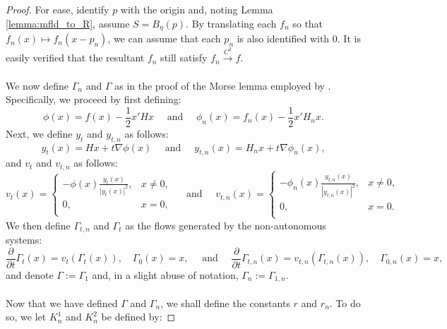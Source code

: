 \documentclass[11pt]{article}
\newcommand{\1}{\mathbf{1}}
\theoremstyle{definition}
\theoremstyle{remark}
\begin{document}
\begin{proof}
    For ease, identify $p$ with the origin and, noting Lemma \ref{lemma:mfld_to_R}, assume $S=B_\eta(p)$. By translating each $f_n$ so that $f_n(x)\mapsto f_n(x-p_n)$, we can assume that each $p_n$ is also identified with $0$. It is easily verified that the resultant $f_n$ still satisfy $f_n\xrightarrow{C^2}f$.\\
    \\
    We now define $\Gamma_n$ and $\Gamma$ as in the proof of the Morse lemma employed by \cite{ioffe1997}. Specifically, we proceed by first defining:
    \begin{equation}\nonumber
        \phi(x)=f(x)-\frac{1}{2}x'Hx \quad \text{ and } \quad \phi_n(x)=f_n(x)-\frac{1}{2}x'H_nx.
    \end{equation}
    Next, we define $y_t$ and $y_{t,n}$ as follows:
    \begin{equation}\nonumber
        y_t(x) = Hx + t\nabla \phi(x) \quad \text{ and } \quad y_{t,n}(x) = H_nx + t\nabla \phi_n(x),
    \end{equation}
    and $v_t$ and $v_{t,n}$ as follows:
\begin{equation}\nonumber
    v_t(x) = \begin{cases}
        -\phi(x) \frac{y_t(x)}{|y_t(x)|^2}, & x \neq 0, \\
        0, & x =0,\\
    \end{cases}\quad \text{ and } \quad 
    v_{t,n}(x) = \begin{cases}
        -\phi_n(x) \frac{y_{t,n}(x)}{|y_{t,n}(x)|^2}, & x \neq 0, \\
        0, & x =0.\\
    \end{cases}
\end{equation}
We then define $\Gamma_{t,n}$ and $\Gamma_t$ as the flows generated by the non-autonomous systems:
\begin{equation}\nonumber
    \frac{\partial }{\partial t}\Gamma_t(x) = v_t(\Gamma_t(x)), \quad \Gamma_0(x)=x, \quad \text{ and } \quad \frac{\partial }{\partial t}\Gamma_{t,n}(x) = v_{t,n}(\Gamma_{t,n}(x)), \quad \Gamma_{0,n}(x)=x,
\end{equation}
and denote $\Gamma:=\Gamma_1$ and, in a slight abuse of notation, $\Gamma_{n}:=\Gamma_{1,n}$.\\
\\
\noindent
Now that we have defined $\Gamma$ and $\Gamma_n$, we shall define the constants $r$ and $r_n$. To do so, we let $K^1_n$ and $K^2_n$ be defined by:

\end{proof}
\end{document}
